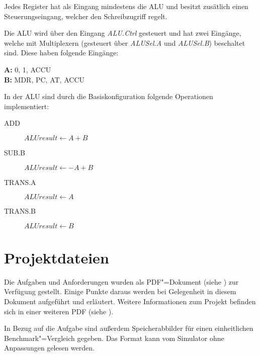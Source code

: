 Jedes Register hat als Eingang mindestens die ALU und besitzt zusätlich einen Steuerungseingang, welcher den Schreibzugriff regelt.

Die ALU wird über den Eingang \emph{ALU.Ctrl} gesteuert und  hat zwei Eingänge, welche mit Multiplexern (gesteuert über \emph{ALUSel.A} und \emph{ALUSel.B}) beschaltet sind. Diese haben folgende Eingänge:

\textbf{A:} 0, 1, ACCU\\
\textbf{B:} MDR, PC, AT, ACCU

In der ALU sind durch die Basiskonfiguration folgende Operationen implementiert:

\begin{description}
    \item[ADD] $ALUresult \gets A + B$
    \item[SUB.B] $ALUresult \gets -A + B$
    \item[TRANS.A] $ALUresult \gets A$
    \item[TRANS.B] $ALUresult \gets B$
\end{description}



\section{Projektdateien}
\label{section:Pflichtenheft-Istzustand-Projektdateien}

Die Aufgaben und Anforderungen wurden als PDF"=Dokument (siehe \cite{aufgabenblatt}) zur Verfügung gestellt. Einige Punkte daraus werden bei Gelegenheit in diesem Dokument aufgeführt und erläutert. Weitere Informationen zum Projekt befinden sich in einer weiteren PDF (siehe \cite{projektinfo}).

In Bezug auf die Aufgabe sind außerdem Speicherabbilder für einen einheitlichen Benchmark"=Vergleich gegeben. Das Format kann vom Simulator ohne Anpassungen gelesen werden.

